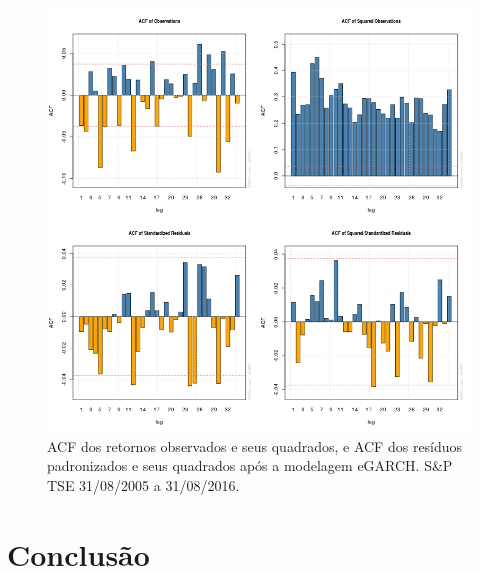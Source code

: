\documentclass[review]{elsarticle}
\theoremstyle{definition}
\begin{document}
\begin{figure}[H]
	\centering
	\includegraphics[width=0.9\linewidth]{artigo-acf-SP-TSE}
	\caption{ACF dos retornos observados e seus quadrados, e ACF dos resíduos padronizados e seus quadrados após a modelagem eGARCH. S\&P TSE 31/08/2005 a 31/08/2016.}
	\label{fig:artigo-acf-sptse}
\end{figure}



	

\section{Conclusão}
\end{document}
